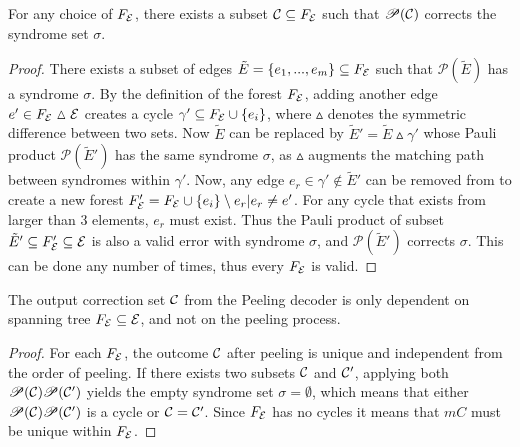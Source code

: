 \begin{lemma}\label{lem:anyforest}
  For any choice of $F_{\mathcal{E}}$, there exists a subset $\mathcal{C}\subseteq F_{\mathcal{E}}$ such that $\mathscr{P}(\mathcal{C})$ corrects the syndrome set $\sigma$.
\end{lemma}
\begin{proof}
  There exists a subset of edges $\tilde{E} = \{e_1,...,e_m\} \subseteq F_{\mathcal{E}}$ such that $\mathscr{P}(\tilde{E})$ has a syndrome $\sigma$. By the definition of the forest $F_{\mathcal{E}}$, adding another edge $e' \in F_{\mathcal{E}} \vartriangle \mathcal{E}$ creates a cycle $\gamma' \subseteq F_{\mathcal{E}} \cup \{e_i\}$, where $\vartriangle$ denotes the symmetric difference between two sets. Now $\tilde{E}$ can be replaced by $\tilde{E}'=\tilde{E}\vartriangle\gamma'$ whose Pauli product $\mathscr{P}(\tilde{E}')$ has the same syndrome $\sigma$, as $\vartriangle$ augments the matching path between syndromes within $\gamma'$. Now, any edge $e_r\in \gamma' \notin \tilde{E}'$ can be removed from to create a new forest $F_{\mathcal{E}}'=F_{\mathcal{E}} \cup \{e_i\}\setminus e_r|e_r \neq e'$. For any cycle that exists from larger than 3 elements, $e_r$ must exist. Thus the Pauli product of subset $\tilde{E}' \subseteq F_{\mathcal{E}}'\subseteq \mathcal{E}$ is also a valid error with syndrome $\sigma$, and $\mathscr{P}(\tilde{E}')$ corrects $\sigma$. This can be done any number of times, thus every $F_{\mathcal{E}}$ is valid.   
\end{proof}
\begin{lemma}\label{lem:peelingfe}
  The output correction set $\mathcal{C}$ from the Peeling decoder is only dependent on spanning tree $F_{\mathcal{E}}\subseteq\mathcal{E}$, and not on the peeling process. 
\end{lemma}
\begin{proof}
   For each $F_{\mathcal{E}}$, the outcome $\mathcal{C}$ after peeling is unique and independent from the order of peeling. If there exists two subsets $\mathcal{C}$ and $\mathcal{C}'$, applying both $\mathscr{P}(\mathcal{C})\mathscr{P}(\mathcal{C}')$ yields the empty syndrome set $\sigma=\emptyset$, which means that either $\mathscr{P}(\mathcal{C})\mathscr{P}(\mathcal{C}')$ is a cycle or $\mathcal{C}=\mathcal{C}'$. Since $F_{\mathcal{E}}$ has no cycles it means that $m{C}$ must be unique within $F_{\mathcal{E}}$.
\end{proof}



